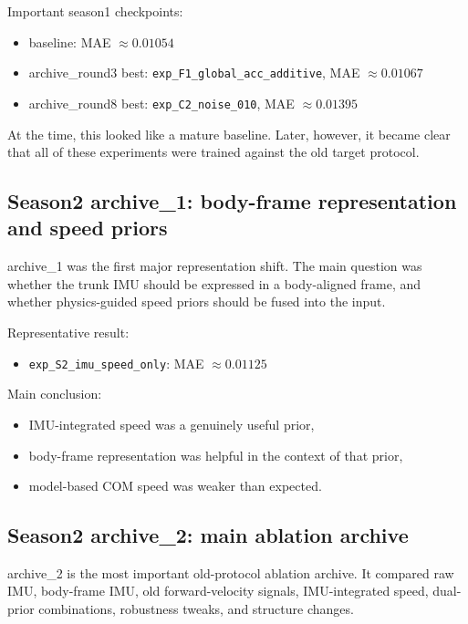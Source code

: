 \documentclass[11pt,a4paper]{article}
\begin{document}
Important season1 checkpoints:

\begin{itemize}
\item baseline: MAE \(\approx 0.01054\)
\item archive\_round3 best: \texttt{exp\_F1\_global\_acc\_additive}, MAE \(\approx 0.01067\)
\item archive\_round8 best: \texttt{exp\_C2\_noise\_010}, MAE \(\approx 0.01395\)
\end{itemize}

At the time, this looked like a mature baseline. Later, however, it became clear that all of these experiments were trained against the old target protocol.

\subsection{Season2 archive\_1: body-frame representation and speed priors}

archive\_1 was the first major representation shift. The main question was whether the trunk IMU should be expressed in a body-aligned frame, and whether physics-guided speed priors should be fused into the input.

Representative result:

\begin{itemize}
\item \texttt{exp\_S2\_imu\_speed\_only}: MAE \(\approx 0.01125\)
\end{itemize}

Main conclusion:

\begin{itemize}
\item IMU-integrated speed was a genuinely useful prior,
\item body-frame representation was helpful in the context of that prior,
\item model-based COM speed was weaker than expected.
\end{itemize}

\subsection{Season2 archive\_2: main ablation archive}

archive\_2 is the most important old-protocol ablation archive. It compared raw IMU, body-frame IMU, old forward-velocity signals, IMU-integrated speed, dual-prior combinations, robustness tweaks, and structure changes.
\end{document}
